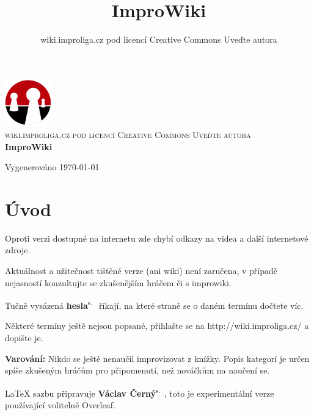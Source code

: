 \documentclass[a4paper,10pt,openany]{book}
\title{ImproWiki}
\author{wiki.improliga.cz pod licencí Creative Commons Uveďte autora}
\newcommand{\odkaz}[2]{ \textbf{#1}\textsuperscript{s.~\pageref{#2}}}
\begin{document}
\begin{titlepage}
\begin{center}

\includegraphics[width=0.15\textwidth]{./logo}~\\[5cm]

\textsc{\Large wiki.improliga.cz pod licencí Creative Commons Uveďte autora }\\[0.5cm]

{ \huge \bfseries ImproWiki \\[0.4cm] }



\vfill

{\large Vygenerováno \today}

\end{center}




\end{titlepage}
 
\chapter{Úvod}\label{úvod}

 

Oproti verzi dostupné na internetu zde chybí odkazy na videa a další internetové zdroje.

Aktuálnost a užitečnost tištěné verze (ani wiki) není zaručena, v případě nejasností konzultujte se zkušenějším hráčem či s improwiki.

Tučně vysázená \odkaz{hesla}{úvod} říkají, na které straně se o daném termínu dočtete víc.

Některé termíny ještě nejsou popsané, přihlašte se na http://wiki.improliga.cz/ a dopište je.

\textbf{Varování:} Nikdo se ještě nenaučil improvizovat z knížky. Popis kategorí je určen spíše zkušeným hráčům pro připomenutí, než nováčkům na naučení se.  

\LaTeX{} sazbu připravuje  \odkaz{Václav Černý}{uživatel:vatoz}, toto je experimentální verze používající volitelně Overleaf.
\end{document}
